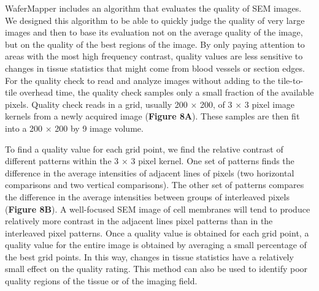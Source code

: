 \documentclass{article}
\begin{document}
WaferMapper includes an algorithm that evaluates the quality of SEM images. We designed this algorithm to be able to quickly judge the quality of very large images and then to base its evaluation not on the average quality of the image, but on the quality of the best regions of the image. By only paying attention to areas with the most high frequency contrast, quality values are less sensitive to changes in tissue statistics that might come from blood vessels or section edges. For the quality check to read and analyze images without adding to the tile-to-tile overhead time, the quality check samples only a small fraction of the available pixels. Quality check reads in a grid, usually 200 × 200, of 3 × 3 pixel image kernels from a newly acquired image (\textbf{Figure 8A}). These samples are then fit into a 200 × 200 by 9 image volume.

To find a quality value for each grid point, we find the relative contrast of different patterns within the 3 × 3 pixel kernel. One set of patterns finds the difference in the average intensities of adjacent lines of pixels (two horizontal comparisons and two vertical comparisons). The other set of patterns compares the difference in the average intensities between groups of interleaved pixels (\textbf{Figure 8B}). A well-focused SEM image of cell membranes will tend to produce relatively more contrast in the adjacent lines 
pixel patterns than in the interleaved pixel patterns. Once a quality value is obtained for each grid point, a quality value for the entire image is obtained by averaging a small percentage of the best grid points. In this way, changes in tissue statistics have a relatively small effect on the quality rating. This method can also be used to identify poor quality regions of the tissue or of the imaging field.
\end{document}
